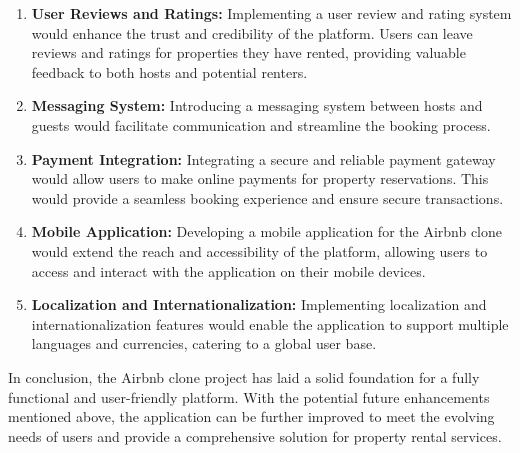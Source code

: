 \begin{enumerate}
	\item \textbf{User Reviews and Ratings: } Implementing a user review and rating system would enhance the trust and credibility of the platform. Users can leave reviews and ratings for properties they have rented, providing valuable feedback to both hosts and potential renters.
	\item \textbf{Messaging System: } Introducing a messaging system between hosts and guests would facilitate communication and streamline the booking process. 
	\item \textbf{Payment Integration: } Integrating a secure and reliable payment gateway would allow users to make online payments for property reservations. This would provide a seamless booking experience and ensure secure transactions.
	\item \textbf{Mobile Application: } Developing a mobile application for the Airbnb clone would extend the reach and accessibility of the platform, allowing users to access and interact with the application on their mobile devices.
	\item \textbf{Localization and Internationalization: }Implementing localization and internationalization features would enable the application to support multiple languages and currencies, catering to a global user base.
\end{enumerate}

In conclusion, the Airbnb clone project has laid a solid foundation for a fully functional and user-friendly platform. With the potential future enhancements mentioned above, the application can be further improved to meet the evolving needs of users and provide a comprehensive solution for property rental services.